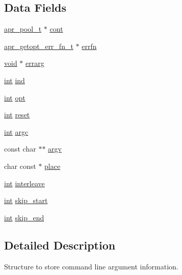 \subsection*{Data Fields}
\begin{DoxyCompactItemize}
\item 
\hyperlink{structapr__pool__t}{apr\+\_\+pool\+\_\+t} $\ast$ \hyperlink{structapr__getopt__t_a63a073fb9c11bb2713b3d7f967e95a24}{cont}
\item 
\hyperlink{group__apr__getopt_ga67c949e3d93e50e12347acd92a3bbe18}{apr\+\_\+getopt\+\_\+err\+\_\+fn\+\_\+t} $\ast$ \hyperlink{structapr__getopt__t_a6bf3fd7ad92d1f0161cd895e1ad50d06}{errfn}
\item 
\hyperlink{group__MOD__ISAPI_gacd6cdbf73df3d9eed42fa493d9b621a6}{void} $\ast$ \hyperlink{structapr__getopt__t_a46db55c58789ab7fa99bb49544b0776e}{errarg}
\item 
\hyperlink{pcre_8txt_a42dfa4ff673c82d8efe7144098fbc198}{int} \hyperlink{structapr__getopt__t_ab04d49d670f095c3244dc9792b70ff07}{ind}
\item 
\hyperlink{pcre_8txt_a42dfa4ff673c82d8efe7144098fbc198}{int} \hyperlink{structapr__getopt__t_a4f842391b8f8f19e562584fdd29d0654}{opt}
\item 
\hyperlink{pcre_8txt_a42dfa4ff673c82d8efe7144098fbc198}{int} \hyperlink{structapr__getopt__t_abc4e72bc761666c0b0d9015c3b0de8c3}{reset}
\item 
\hyperlink{pcre_8txt_a42dfa4ff673c82d8efe7144098fbc198}{int} \hyperlink{structapr__getopt__t_a58aeb33137aabdd5a00efbde05652094}{argc}
\item 
const char $\ast$$\ast$ \hyperlink{structapr__getopt__t_a296c27d8db2fe6d4b88c5c7a85c40c02}{argv}
\item 
char const $\ast$ \hyperlink{structapr__getopt__t_a87961387d1c71bebfbdf69c7f392d2d5}{place}
\item 
\hyperlink{pcre_8txt_a42dfa4ff673c82d8efe7144098fbc198}{int} \hyperlink{structapr__getopt__t_a771dbef87345c731845dd63723fb34db}{interleave}
\item 
\hyperlink{pcre_8txt_a42dfa4ff673c82d8efe7144098fbc198}{int} \hyperlink{structapr__getopt__t_a0cd41eedf9ed82bf5d9dcc3491ee67dd}{skip\+\_\+start}
\item 
\hyperlink{pcre_8txt_a42dfa4ff673c82d8efe7144098fbc198}{int} \hyperlink{structapr__getopt__t_ae9e7e6eb1576820c7dc6e589cc3a28b7}{skip\+\_\+end}
\end{DoxyCompactItemize}


\subsection{Detailed Description}
Structure to store command line argument information. 

